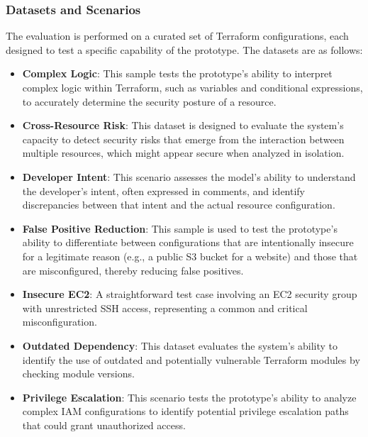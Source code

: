 \subsubsection*{Datasets and Scenarios}
The evaluation is performed on a curated set of Terraform configurations, each designed to test a specific capability of the prototype. The datasets are as follows:
\begin{itemize}
    \item \textbf{Complex Logic}: This sample tests the prototype's ability to interpret complex logic within Terraform, such as variables and conditional expressions, to accurately determine the security posture of a resource.
    \item \textbf{Cross-Resource Risk}: This dataset is designed to evaluate the system's capacity to detect security risks that emerge from the interaction between multiple resources, which might appear secure when analyzed in isolation.
    \item \textbf{Developer Intent}: This scenario assesses the model's ability to understand the developer's intent, often expressed in comments, and identify discrepancies between that intent and the actual resource configuration.
    \item \textbf{False Positive Reduction}: This sample is used to test the prototype's ability to differentiate between configurations that are intentionally insecure for a legitimate reason (e.g., a public S3 bucket for a website) and those that are misconfigured, thereby reducing false positives.
    \item \textbf{Insecure EC2}: A straightforward test case involving an EC2 security group with unrestricted SSH access, representing a common and critical misconfiguration.
    \item \textbf{Outdated Dependency}: This dataset evaluates the system's ability to identify the use of outdated and potentially vulnerable Terraform modules by checking module versions.
    \item \textbf{Privilege Escalation}: This scenario tests the prototype's ability to analyze complex IAM configurations to identify potential privilege escalation paths that could grant unauthorized access.
\end{itemize}


